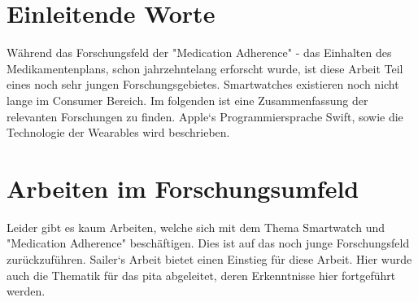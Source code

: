 

\section{Einleitende Worte}
Während das Forschungsfeld der "Medication Adherence" - das Einhalten des Medikamentenplans, schon jahrzehntelang erforscht wurde, ist diese Arbeit Teil eines noch sehr jungen Forschungsgebietes. Smartwatches existieren noch nicht lange im Consumer Bereich. Im folgenden ist eine Zusammenfassung der relevanten Forschungen zu finden. Apple`s Programmiersprache Swift, sowie die Technologie der Wearables wird beschrieben.
\section{Arbeiten im Forschungsumfeld}
Leider gibt es kaum Arbeiten, welche sich mit dem Thema Smartwatch und "Medication Adherence" beschäftigen. Dies ist auf das noch junge Forschungsfeld zurückzuführen. Sailer`s Arbeit \cite{Fabian-Sailer:2015aa} bietet einen Einstieg für diese Arbeit. Hier wurde auch die Thematik für das \gls{pita} abgeleitet, deren Erkenntnisse hier fortgeführt werden. 

